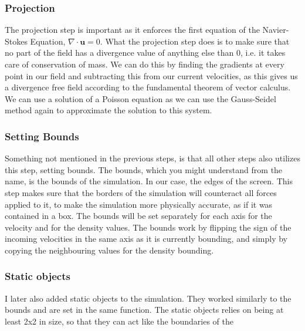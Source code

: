 \documentclass{article}
\begin{document}
\begin{multicols}{2}
\subsubsection{Projection}
The projection step is important as it enforces the first equation of the Navier-Stokes Equation, $\nabla \cdot \bm{u}=0$. What the projection step does is to make sure that no part of the field has a divergence value of anything else than $0$, i.e. it takes care of conservation of mass. We can do this by finding the gradients at every point in our field and subtracting this from our current velocities, as this gives us a divergence free field according to the fundamental theorem of vector calculus. We can use a solution of a Poisson equation as we can use the Gauss-Seidel method again to approximate the solution to this system.

\subsubsection{Setting Bounds}
Something not mentioned in the previous steps, is that all other steps also utilizes this step, setting bounds. The bounds, which you might understand from the name, is the bounds of the simulation. In our case, the edges of the screen. This step makes sure that the borders of the simulation will counteract all forces applied to it, to make the simulation more physically accurate, as if it was contained in a box. The bounds will be set separately for each axis for the velocity and for the density values. The bounds work by flipping the sign of the incoming velocities in the same axis as it is currently bounding, and simply by copying the neighbouring values for the density bounding.

\subsubsection{Static objects}
I later also added static objects to the simulation. They worked similarly to the bounds and are set in the same function. The static objects relies on being at least 2x2 in size, so that they can act like the boundaries of the%
\end{multicols}%
\end{document}

